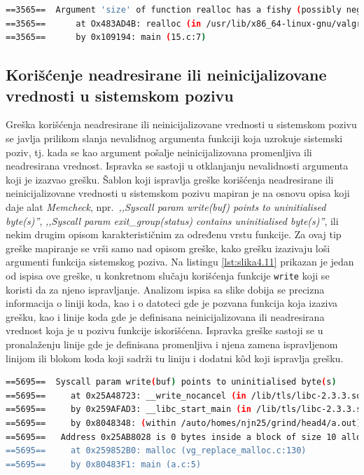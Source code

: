 \documentclass[12pt,oneside]{memoir}
\theoremstyle{plain}
\theoremstyle{definition}
\begin{document}

\begin{lstlisting}[style=terminal,caption={Ispis greške sumnjive vrednosti argumenta}, label={lst:slika4.10},language={bash}]   
==3565==  Argument 'size' of function realloc has a fishy (possibly negative) value: -12
==3565==      at Ox483AD4B: realloc (in /usr/lib/x86_64-linux-gnu/valgrind/vgpreload_memcheck-amd64-linux.so) 
==3565==      by 0x109194: main (15.c:7)
\end{lstlisting}

\subsection{Korišćenje neadresirane ili neinicijalizovane vrednosti u sistemskom pozivu}
Greška korišćenja neadresirane ili neinicijalizovane vrednosti u sistemskom pozivu se javlja prilikom slanja nevalidnog argumenta funkciji koja uzrokuje sistemski poziv, tj. kada se kao argument pošalje neinicijalizovana promenljiva ili neadresirana vrednost. Ispravka se sastoji u otklanjanju nevalidnosti argumenta koji je izazvao grešku. Šablon koji ispravlja greške korišćenja neadresirane ili neinicijalizovane vrednosti u sistemskom pozivu mapiran je na osnovu opisa koji daje alat \textit{Memcheck}, npr.~\textit{,,Syscall param write(buf) points to uninitialised byte(s)''}, \textit{,,Syscall param exit\_group(status) contains uninitialised byte(s)''}, ili nekim drugim opisom karakterističnim za određenu vrstu funkcije. Za ovaj tip greške mapiranje se vrši samo nad opisom greške, kako grešku izazivaju loši argumenti funkcija sistemskog poziva. Na listingu \ref{lst:slika4.11} prikazan je jedan od ispisa ove greške, u konkretnom slučaju korišćenja funkcije \texttt{write} koji se koristi da za njeno ispravljanje. Analizom ispisa sa slike dobija se precizna informacija o liniji koda, kao i o datoteci gde je pozvana funkcija koja izaziva grešku, kao i linije koda gde je definisana neinicijalizovana ili neadresirana vrednost koja je u pozivu funkcije iskorišćena. Ispravka greške sastoji se u pronalaženju linije gde je definisana promenljiva i njena zamena ispravljenom linijom ili blokom koda koji sadrži tu liniju i dodatni k\^od koji ispravlja grešku.  

\begin{lstlisting}[style=terminal,caption={Primer ispisa greške korišćenja neinicializovane ili neadresirane vrednosti u sistemskom pozivu}, label={lst:slika4.11},language={bash}] 
==5695==  Syscall param write(buf) points to uninitialised byte(s)
==5695==     at 0x25A48723: __write_nocancel (in /lib/tls/libc-2.3.3.so)
==5695==     by 0x259AFAD3: __libc_start_main (in /lib/tls/libc-2.3.3.so)
==5695==     by 0x8048348: (within /auto/homes/njn25/grind/head4/a.out)
==5695==   Address 0x25AB8028 is 0 bytes inside a block of size 10 alloc'd
==5695==     at 0x259852B0: malloc (vg_replace_malloc.c:130)
==5695==     by 0x80483F1: main (a.c:5)
\end{lstlisting}
\end{document}
